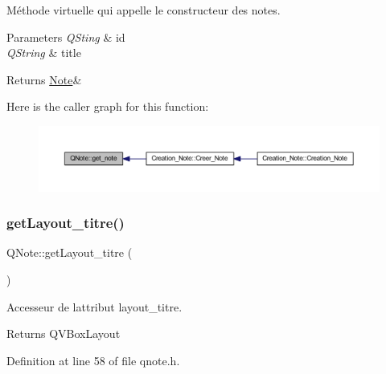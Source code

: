 Méthode virtuelle qui appelle le constructeur des notes. 


\begin{DoxyParams}{Parameters}
{\em Q\+Sting} & id \\
\hline
{\em Q\+String} & title \\
\hline
\end{DoxyParams}
\begin{DoxyReturn}{Returns}
\hyperlink{class_note}{Note}\& 
\end{DoxyReturn}
Here is the caller graph for this function\+:\nopagebreak
\begin{figure}[H]
\begin{center}
\leavevmode
\includegraphics[width=350pt]{class_q_note_a899d74d257db09590cd27a02ebad65da_icgraph}
\end{center}
\end{figure}
\mbox{\label{class_q_note_a7cfd446c3cf5a52caa7b07aa1ccb42f8}} 
\subsubsection{\texorpdfstring{get\+Layout\+\_\+titre()}{getLayout\_titre()}}
{\footnotesize\ttfamily Q\+Note\+::get\+Layout\+\_\+titre (\begin{DoxyParamCaption}{ }\end{DoxyParamCaption})\hspace{0.3cm}{\ttfamily [inline]}}



Accesseur de l\textquotesingle{}attribut layout\+\_\+titre. 

\begin{DoxyReturn}{Returns}
Q\+V\+Box\+Layout 
\end{DoxyReturn}


Definition at line 58 of file qnote.\+h.

